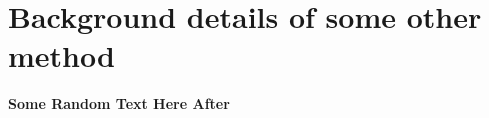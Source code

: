 \chapter{Background details of some other method}


\textbf{Some Random Text Here After}
\lipsum[1-20]
